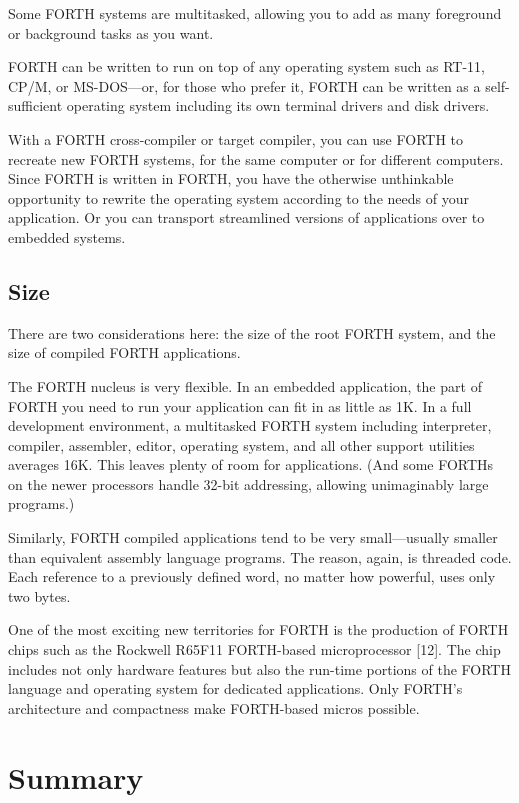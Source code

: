 Some FORTH systems are multitasked, allowing you to add as many foreground
or background tasks as you want.

FORTH can be written to run on top of any operating system such as
RT-11, CP/M, or MS-DOS---or, for those who prefer it, FORTH can be
written as a self-sufficient operating system including its own terminal
drivers and disk drivers.

With a FORTH cross-compiler or target compiler, you can use FORTH
to recreate new FORTH systems, for the same computer or for different
computers. Since FORTH is written in FORTH, you have the otherwise
unthinkable opportunity to rewrite the operating system according
to the needs of your application. Or you can transport streamlined
versions of applications over to embedded systems. 


\subsection{Size}

There are two considerations here: the size of the root FORTH system,
and the size of compiled FORTH applications.

The FORTH nucleus is very flexible. In an embedded application, the
part of FORTH you need to run your application can fit in as little
as 1K. In a full development environment, a multitasked FORTH system
including interpreter, compiler, assembler, editor, operating system,
and all other support utilities averages 16K. This leaves plenty of
room for applications. (And some FORTHs on the newer processors handle
32-bit addressing, allowing unimaginably large programs.)

Similarly, FORTH compiled applications tend to be very small---usually
smaller than equivalent assembly language programs. The reason, again,
is threaded code. Each reference to a previously defined word, no
matter how powerful, uses only two bytes.

One of the most exciting new territories for FORTH is the production
of FORTH chips such as the Rockwell R65F11 FORTH-based microprocessor
{[}12{]}. The chip includes not only hardware features but also the
run-time portions of the FORTH language and operating system for dedicated
applications. Only FORTH's architecture and compactness make FORTH-based
micros possible.


\section{Summary}

